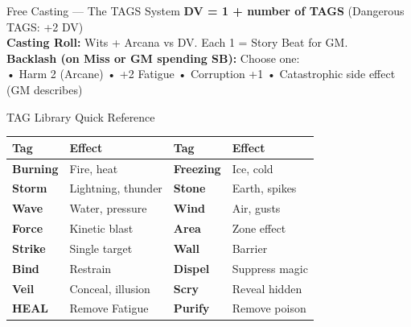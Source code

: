 \documentclass[10pt]{article}
\begin{document}
\begin{minipage}[t]{0.48\linewidth}
    \vspace{0.5em}
    
    \begin{charbox}{Free Casting --- The TAGS System}
        \textbf{DV = 1 + number of TAGS} (Dangerous TAGS: +2 DV)\\
        \textbf{Casting Roll:} Wits + Arcana vs DV. Each 1 = Story Beat for GM.\\
        \textbf{Backlash (on Miss or GM spending SB):} Choose one:\\
        • Harm 2 (Arcane) • +2 Fatigue • Corruption +1 • Catastrophic side effect (GM describes)
    \end{charbox}
    
    \vspace{0.5em}
    
    \begin{charbox}{TAG Library Quick Reference}
        \begin{tabular}{>{\bfseries}p{2cm} p{3cm} >{\bfseries}p{2cm} p{3cm}}
            \toprule
            \textbf{Tag} & \textbf{Effect} & \textbf{Tag} & \textbf{Effect} \\
            \midrule
            Burning & Fire, heat & Freezing & Ice, cold \\
            Storm & Lightning, thunder & Stone & Earth, spikes \\
            Wave & Water, pressure & Wind & Air, gusts \\
            Force & Kinetic blast & Area & Zone effect \\
            Strike & Single target & Wall & Barrier \\
            Bind & Restrain & Dispel & Suppress magic \\
            Veil & Conceal, illusion & Scry & Reveal hidden \\
            HEAL & Remove Fatigue & Purify & Remove poison \\
            \bottomrule
        \end{tabular}
    \end{charbox}
\end{minipage}
\hfill
\end{document}
